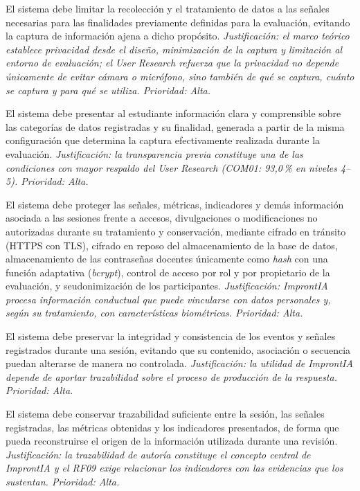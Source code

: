 \begin{description}[leftmargin=0cm, style=nextline]
\item[\textbf{RNF01 --- Minimización y proporcionalidad de datos}] El sistema debe limitar la recolección y el tratamiento de datos a las señales necesarias para las finalidades previamente definidas para la evaluación, evitando la captura de información ajena a dicho propósito. \textit{Justificación: el marco teórico establece privacidad desde el diseño, minimización de la captura y limitación al entorno de evaluación; el User Research refuerza que la privacidad no depende únicamente de evitar cámara o micrófono, sino también de qué se captura, cuánto se captura y para qué se utiliza. Prioridad: Alta.}
\item[\textbf{RNF02 --- Transparencia del tratamiento de información}] El sistema debe presentar al estudiante información clara y comprensible sobre las categorías de datos registradas y su finalidad, generada a partir de la misma configuración que determina la captura efectivamente realizada durante la evaluación. \textit{Justificación: la transparencia previa constituye una de las condiciones con mayor respaldo del User Research (COM01: 93{,}0\,\% en niveles 4--5). Prioridad: Alta.}
\item[\textbf{RNF03 --- Protección y confidencialidad de la información}] El sistema debe proteger las señales, métricas, indicadores y demás información asociada a las sesiones frente a accesos, divulgaciones o modificaciones no autorizadas durante su tratamiento y conservación, mediante cifrado en tránsito (HTTPS con TLS), cifrado en reposo del almacenamiento de la base de datos, almacenamiento de las contraseñas docentes únicamente como \textit{hash} con una función adaptativa (\textit{bcrypt}), control de acceso por rol y por propietario de la evaluación, y seudonimización de los participantes. \textit{Justificación: ImprontIA procesa información conductual que puede vincularse con datos personales y, según su tratamiento, con características biométricas. Prioridad: Alta.}
\item[\textbf{RNF04 --- Integridad de los registros de sesión}] El sistema debe preservar la integridad y consistencia de los eventos y señales registrados durante una sesión, evitando que su contenido, asociación o secuencia puedan alterarse de manera no controlada. \textit{Justificación: la utilidad de ImprontIA depende de aportar trazabilidad sobre el proceso de producción de la respuesta. Prioridad: Alta.}
\item[\textbf{RNF05 --- Trazabilidad de la información procesada}] El sistema debe conservar trazabilidad suficiente entre la sesión, las señales registradas, las métricas obtenidas y los indicadores presentados, de forma que pueda reconstruirse el origen de la información utilizada durante una revisión. \textit{Justificación: la trazabilidad de autoría constituye el concepto central de ImprontIA y el RF09 exige relacionar los indicadores con las evidencias que los sustentan. Prioridad: Alta.}

\end{description}
